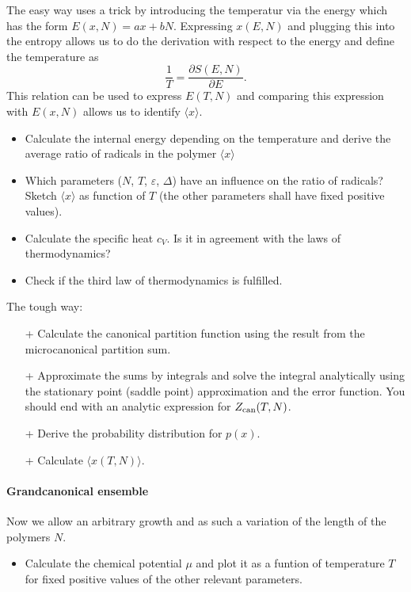 \documentclass[12pt,a4paper]{article} %
\begin{document}
The easy way uses a trick by introducing the temperatur via the energy which has the form $E(x,N) = ax+bN$.
Expressing $x(E,N)$ and plugging this into the entropy allows us to do the derivation with respect to the energy and define the temperature as $$\frac{1}{T} = \frac{\partial S(E,N)}{\partial E}.$$ 
This relation can be used to express $E(T,N)$ and comparing this expression with $E(x,N)$ allows us to identify $\langle x \rangle$. 

\begin{itemize}
 \item Calculate the internal energy depending on the temperature and derive the average ratio of radicals in the polymer $\langle x \rangle$
 \item Which parameters ($N$, $T$, $\varepsilon$, $\Delta$) have an influence on the ratio of radicals?\\
 Sketch  $\langle x \rangle$ as function of $T$ (the other parameters shall have fixed positive values).
 \item Calculate the specific heat $c_V$. Is it in agreement with the laws of thermodynamics?
 \item Check if the third law of thermodynamics is fulfilled.
\end{itemize}


The tough way:
\begin{itemize}
 \item[+] Calculate the canonical partition function using the result from the microcanonical partition sum.
 \item[+] Approximate the sums by integrals and solve the integral analytically using the stationary point (saddle point) approximation and the error function. You should end with an analytic expression for $Z_{\textnormal{can}}(T,N)$. 
 \item[+] Derive the probability distribution for $p(x)$.
 \item[+] Calculate $\langle x(T,N)\rangle$.
\end{itemize}

\paragraph{Grandcanonical ensemble}
Now we allow an arbitrary growth and as such a variation of the length of the polymers $N$. 
\begin{itemize}
 \item Calculate the chemical potential $\mu$ and plot it as a funtion of temperature $T$ for fixed positive values of the other relevant parameters.
\end{itemize}
\end{document}
